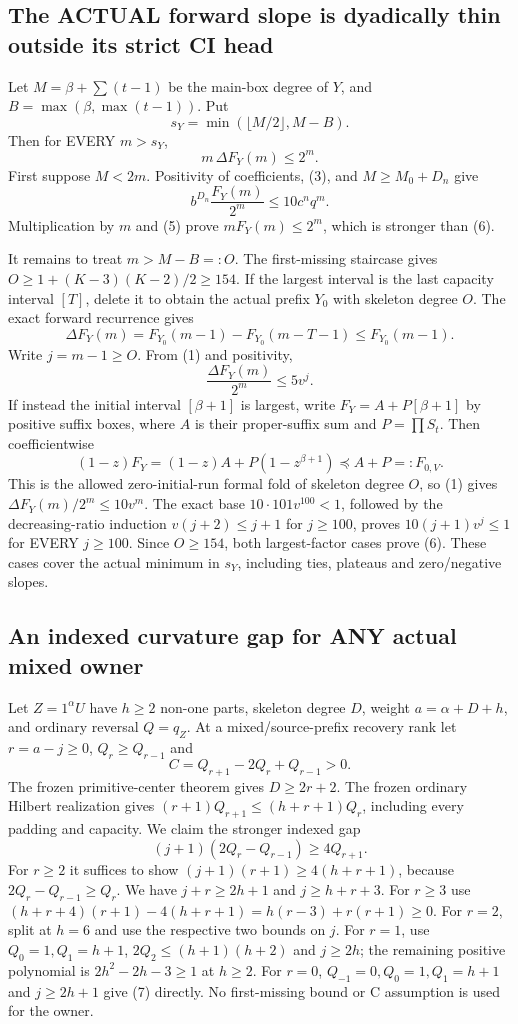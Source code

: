\subsection{The ACTUAL forward slope is dyadically thin outside its strict CI head}
Let $M=\beta+\sum(t-1)$ be the main-box degree of $Y$, and
$B=\max(\beta,\max(t-1))$. Put
\[
                            s_Y=\min(\lfloor M/2\rfloor,M-B).
\]
Then for EVERY $m>s_Y$,
\[
                          m\,\Delta F_Y(m)\le2^m.    \tag{6}
\]
First suppose $M<2m$. Positivity of coefficients, (3), and
$M\ge M_0+D_n$ give
\[
 b^{D_n}\frac{F_Y(m)}{2^m}
        \le10c^n q^m.
\]
Multiplication by $m$ and (5) prove $mF_Y(m)\le2^m$,
which is stronger than (6).

It remains to treat $m>M-B=:O$. The first-missing staircase gives
$O\ge1+(K-3)(K-2)/2\ge154$.
If the largest interval is the last capacity interval $[T]$, delete it
to obtain the actual prefix $Y_0$ with skeleton degree $O$. The exact
forward recurrence gives
\[
 \Delta F_Y(m)=F_{Y_0}(m-1)-F_{Y_0}(m-T-1)\le F_{Y_0}(m-1).
\]
Write $j=m-1\ge O$. From (1) and positivity,
\[
                   \frac{\Delta F_Y(m)}{2^m}\le5v^j.
\]
If instead the initial interval $[\beta+1]$ is largest, write
$F_Y=A+P[\beta+1]$ by positive suffix boxes, where
$A$ is their proper-suffix sum and $P=\prod S_t$.
Then coefficientwise
\[
 (1-z)F_Y=(1-z)A+P(1-z^{\beta+1})\preceq A+P=:F_{0,V}.
\]
This is the allowed zero-initial-run formal fold of skeleton degree $O$,
so (1) gives $\Delta F_Y(m)/2^m\le10v^m$.
The exact base $10\cdot101v^{100}<1$, followed by the decreasing-ratio
induction $v(j+2)\le j+1$ for $j\ge100$, proves
$10(j+1)v^j\le1$ for EVERY $j\ge100$. Since $O\ge154$,
both largest-factor cases prove (6). These cases cover the actual minimum
in $s_Y$, including ties, plateaus and zero/negative slopes.

\subsection{An indexed curvature gap for ANY actual mixed owner}
Let $Z=1^\alpha U$ have $h\ge2$ non-one parts, skeleton degree $D$,
weight $a=\alpha+D+h$, and ordinary reversal $Q=q_Z$.
At a mixed/source-prefix recovery rank let $r=a-j\ge0$,
$Q_r\ge Q_{r-1}$ and
\[
                           C=Q_{r+1}-2Q_r+Q_{r-1}>0.
\]
The frozen primitive-center theorem gives $D\ge2r+2$.
The frozen ordinary Hilbert realization gives
$(r+1)Q_{r+1}\le(h+r+1)Q_r$, including every padding and capacity.
We claim the stronger indexed gap
\[
                    (j+1)(2Q_r-Q_{r-1})\ge4Q_{r+1}.  \tag{7}
\]
For $r\ge2$ it suffices to show
$(j+1)(r+1)\ge4(h+r+1)$, because $2Q_r-Q_{r-1}\ge Q_r$.
We have $j+r\ge2h+1$ and $j\ge h+r+3$.
For $r\ge3$ use
$(h+r+4)(r+1)-4(h+r+1)=h(r-3)+r(r+1)\ge0$.
For $r=2$, split at $h=6$ and use the respective two bounds on $j$.
For $r=1$, use $Q_0=1,Q_1=h+1$,
$2Q_2\le(h+1)(h+2)$ and $j\ge2h$; the remaining positive polynomial
is $2h^2-2h-3\ge1$ at $h\ge2$.
For $r=0$, $Q_{-1}=0,Q_0=1,Q_1=h+1$ and $j\ge2h+1$ give (7)
directly. No first-missing bound or C assumption is used for the owner.

